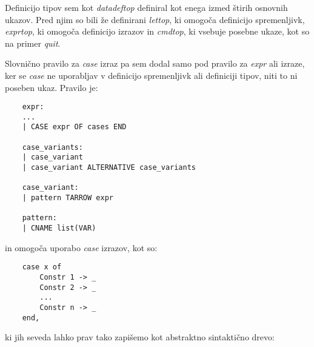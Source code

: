 \documentclass[12pt,a4paper,openany]{book}
\begin{document}
Definicijo tipov sem kot \emph{datadeftop} definiral kot enega izmed štirih osnovnih ukazov. Pred njim so bili že definirani \emph{lettop}, ki omogoča definicijo 
spremenljivk, \emph{exprtop}, ki omogoča definicijo izrazov in \emph{cmdtop}, ki vsebuje posebne ukaze, kot so na primer \emph{quit}.

Slovnično pravilo za \emph{case} izraz pa sem dodal samo pod pravilo za \emph{expr} ali izraze, ker se \emph{case} ne uporabljav v definicijo spremenljivk ali
definiciji tipov, niti to ni poseben ukaz. Pravilo je: 
\begin{lstlisting}
    expr:
    ...
    | CASE expr OF cases END

	case_variants:
	| case_variant
	| case_variant ALTERNATIVE case_variants
  
    case_variant:
	| pattern TARROW expr
  
    pattern:
	| CNAME list(VAR)
\end{lstlisting}
in omogoča uporabo \emph{case} izrazov, kot so:
\begin{lstlisting}
    case x of 
        Constr 1 -> _
        Constr 2 -> _
        ...
        Constr n -> _
    end,
\end{lstlisting}
ki jih seveda lahko prav tako zapišemo kot abstraktno sintaktično drevo:
\begin{center}
\end{center}
\end{document}
